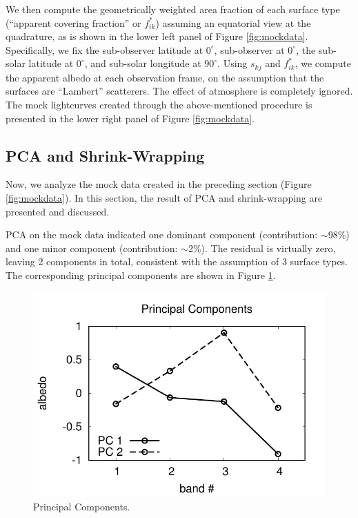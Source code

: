 \documentclass[iop,numberedappendix,apj,]{emulateapj}
\begin{document}
We then compute the geometrically weighted area fraction of each surface type (``apparent covering fraction'' or $f^{\ast }_{ik}$) assuming an equatorial view at the quadrature, as is shown in the lower left panel of Figure \ref{fig:mockdata}. 
Specifically, we fix the sub-observer latitude at $0^{\circ }$, sub-observer at $0^{\circ }$, the sub-solar latitude at $0^{\circ }$, and sub-solar longitude at $90^{\circ }$. 
Using $s_{kj}$ and $f^{\ast }_{ik}$, we compute the apparent albedo at each observation frame, on the assumption that the surfaces are ``Lambert'' scatterers. The effect of atmosphere is completely ignored. 
The mock lightcurves created through the above-mentioned procedure is presented in the lower right panel of Figure \ref{fig:mockdata}. 

\clearpage

\subsection{PCA and Shrink-Wrapping}
\label{ss:shrinkwrap}


Now, we analyze the mock data created in the preceding section (Figure \ref{fig:mockdata}). 
In this section, the result of PCA and shrink-wrapping are presented and discussed. 

PCA on the mock data indicated one dominant component (contribution: $\sim $98\%) and one minor component (contribution: $\sim $2\%). The residual is virtually zero, leaving 2 components in total, consistent with the assumption of 3 surface types. 
The corresponding principal components are shown in Figure \ref{fig:PCs}. 


\begin{figure}[h]
    \begin{center}
\includegraphics[width=\hsize]{PCA_V_jn.pdf}
    \end{center}
    \caption{Principal Components. }
\label{fig:PCs}
\end{figure}
\end{document}
